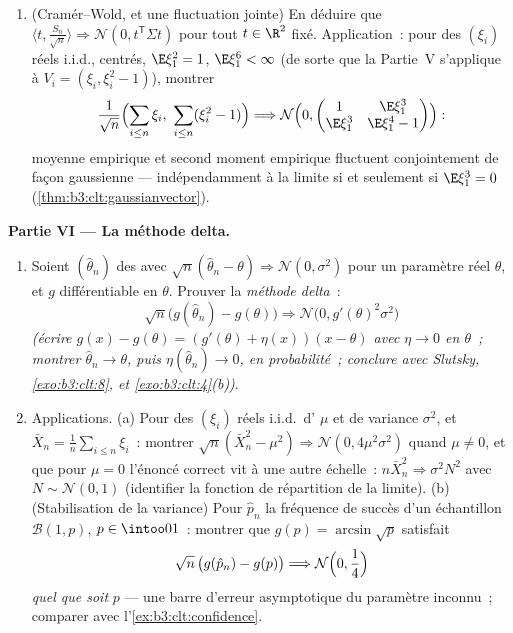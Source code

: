 \begin{problem}
\begin{enumerate}[resume]
        Fourier.
  \item (Cramér--Wold, et une fluctuation jointe) En
        déduire que $\langle t, \frac{S_n}{\sqrt n}\rangle
        \Rightarrow \mathcal N(0, t^{\mathsf T}\Sigma t)$
        pour tout $t \in \R^2$ fixé. Application~: pour des
        $(\xi_i)$ réels i.i.d., centrés, $\E\xi_1^2 = 1$,
        $\E\xi_1^6 < \infty$ (de sorte que la Partie~V
        s'applique à $V_i = (\xi_i, \xi_i^2 - 1)$), montrer
        \[
        \frac1{\sqrt n}\Bigl(\sum_{i\leq n}\xi_i,\
        \sum_{i\leq n}(\xi_i^2 - 1)\Bigr) \Longrightarrow
        \mathcal N\Bigl(0, \begin{pmatrix} 1 & \E\xi_1^3\\
        \E\xi_1^3 & \E\xi_1^4 - 1\end{pmatrix}\Bigr) :
        \]
        moyenne empirique et second moment empirique
        fluctuent conjointement de façon gaussienne ---
        indépendamment à la limite si et seulement si
        $\E\xi_1^3 = 0$ (\cref{thm:b3:clt:gaussianvector}).
\end{enumerate}

\medskip
\noindent\textbf{Partie VI --- La méthode delta.}
\begin{enumerate}[resume]
  \item Soient $(\hat\theta_n)$ des 
        avec $\sqrt n(\hat\theta_n - \theta) \Rightarrow
        \mathcal N(0, \sigma^2)$ pour un paramètre réel
        $\theta$, et $g$ différentiable en $\theta$.
        Prouver la \emph{méthode delta}~:
        \[
        \sqrt n\bigl(g(\hat\theta_n) - g(\theta)\bigr)
        \Longrightarrow \mathcal N\bigl(0,
        g'(\theta)^2\sigma^2\bigr)
        \]
        \emph{(écrire $g(x) - g(\theta) = (g'(\theta) +
        \eta(x))(x - \theta)$ avec $\eta \to 0$ en
        $\theta$~; montrer $\hat\theta_n \to \theta$, puis
        $\eta(\hat\theta_n) \to 0$, en probabilité~;
        conclure avec Slutsky, \cref{exo:b3:clt:8}, et
        \cref{exo:b3:clt:4}(b))}.
  \item Applications. (a) Pour des $(\xi_i)$ réels i.i.d.\
        d' $\mu$ et de variance $\sigma^2$, et
        $\bar X_n = \frac1n\sum_{i\leq n}\xi_i$~: montrer
        $\sqrt n(\bar X_n^2 - \mu^2) \Rightarrow \mathcal
        N(0, 4\mu^2\sigma^2)$ quand $\mu \neq 0$, et que
        pour $\mu = 0$ l'énoncé correct vit à une autre
        échelle~: $n\bar X_n^2 \Rightarrow \sigma^2N^2$
        avec $N \sim \mathcal N(0,1)$ (identifier la
        fonction de répartition de la limite). (b)
        (Stabilisation de la variance) Pour $\hat p_n$ la
        fréquence de succès d'un échantillon $\mathcal
        B(1, p)$, $p \in \intoo01$~: montrer que $g(p) =
        \arcsin\sqrt p$ satisfait
        \[
        \sqrt n\,\bigl(g(\hat p_n) - g(p)\bigr)
        \Longrightarrow \mathcal N\Bigl(0, \frac14\Bigr)
        \]
        \emph{quel que soit} $p$ --- une barre d'erreur
        asymptotique  du paramètre inconnu~; comparer
        avec l'\cref{ex:b3:clt:confidence}.
\end{enumerate}


\end{problem}
